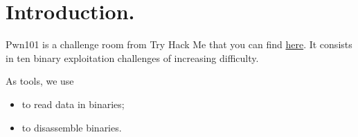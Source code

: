 \section{Introduction.}
\par Pwn101 is a challenge room from Try Hack Me that you can find \href{https://tryhackme.com/room/pwn101}{here}. It consists in ten binary exploitation challenges of increasing difficulty.
\par As tools, we use
\begin{itemize}
	\item {} to read data in binaries;
	\item {} to disassemble binaries.
\end{itemize}
